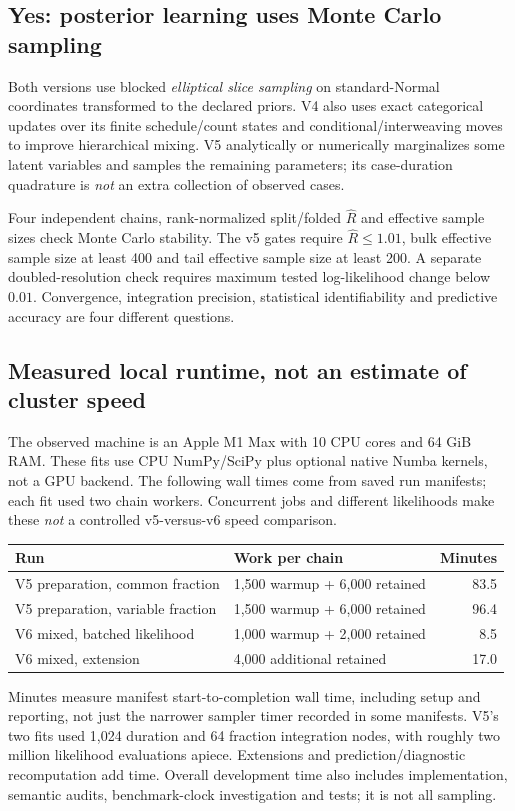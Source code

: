 \documentclass[10pt]{article}
\begin{document}
\subsection*{Yes: posterior learning uses Monte Carlo sampling}
Both versions use blocked \emph{elliptical slice sampling} on standard-Normal
coordinates transformed to the declared priors. V4 also uses exact categorical
updates over its finite schedule/count states and conditional/interweaving moves
to improve hierarchical mixing. V5 analytically or numerically marginalizes some
latent variables and samples the remaining parameters; its case-duration
quadrature is \emph{not} an extra collection of observed cases.

Four independent chains, rank-normalized split/folded $\widehat R$ and effective
sample sizes check Monte Carlo stability. The v5 gates require
$\widehat R\leq1.01$, bulk effective sample size at least 400 and tail effective
sample size at least 200. A separate doubled-resolution check requires maximum
tested log-likelihood change below $0.01$. Convergence, integration precision,
statistical identifiability and predictive accuracy are four different questions.

\subsection*{Measured local runtime, not an estimate of cluster speed}
The observed machine is an Apple M1 Max with 10 CPU cores and 64 GiB RAM. These
fits use CPU NumPy/SciPy plus optional native Numba kernels, not a GPU backend.
The following wall times come from saved run manifests; each fit used two chain
workers. Concurrent jobs and different likelihoods make these \emph{not} a
controlled v5-versus-v6 speed comparison.

{\small
\begin{tabularx}{\linewidth}{@{}p{.42\linewidth}Y r@{}}
\toprule Run & Work per chain & Minutes \\
\midrule
V5 preparation, common fraction & 1,500 warmup + 6,000 retained & 83.5 \\
V5 preparation, variable fraction & 1,500 warmup + 6,000 retained & 96.4 \\
V6 mixed, batched likelihood & 1,000 warmup + 2,000 retained & 8.5 \\
V6 mixed, extension & 4,000 additional retained & 17.0 \\
\bottomrule
\end{tabularx}}
Minutes measure manifest start-to-completion wall time, including setup and
reporting, not just the narrower sampler timer recorded in some manifests.
V5's two fits used 1,024 duration and 64 fraction integration nodes, with roughly
two million likelihood evaluations apiece. Extensions and prediction/diagnostic
recomputation add time. Overall development time also includes implementation,
semantic audits, benchmark-clock investigation and tests; it is not all sampling.
\end{document}
